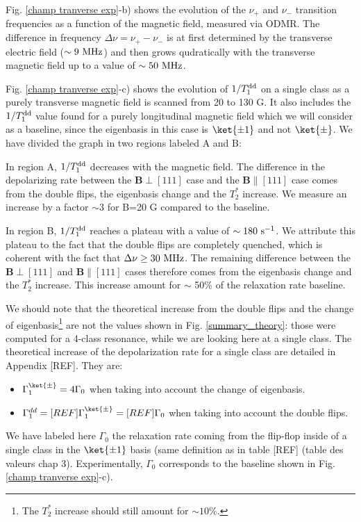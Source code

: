 \documentclass[a4paper,11pt]{report}
\begin{document}
Fig. \ref{champ tranverse exp}-b) shows the evolution of the $\nu_+$ and $\nu_-$ transition frequencies as a function of the magnetic field, measured via ODMR. The difference in frequency $\Delta \nu = \nu_+ - \nu_-$ is at first determined by the transverse electric field ($\sim 9\ \rm MHz$) and then grows qudratically with the transverse magnetic field up to a value of $\sim 50\ \rm MHz$.

Fig. \ref{champ tranverse exp}-c) shows the evolution of $1/T_1^{\rm dd}$ on a single class as a purely transverse magnetic field is scanned from 20 to 130 G. It also includes the $1/T_1^{\rm dd}$ value found for a purely longitudinal magnetic field which we will consider as a baseline, since the eigenbasis in this case is $\ket{\pm 1}$ and not $\ket{\pm}$. We have divided the graph in two regions labeled A and B:

In region A, $1/T_1^{\rm dd}$ decreases with the magnetic field. The difference in the depolarizing rate between the $\mathbf{B} \perp [111]$ case and the $\mathbf{B} \parallel [111]$ case comes from the double flips, the eigenbasis change and the $T_2^*$ increase. We measure an increase by a factor $\sim 3$ for B=20 G compared to the baseline.

In region B, $1/T_1^{\rm dd}$ reaches a plateau with a value of $\sim 180\ \rm s^{-1}$. We attribute this plateau to the fact that the double flips are completely quenched, which is coherent with the fact that $\Delta \nu \geq 30\ \rm MHz$. The remaining difference between the $\mathbf{B} \perp [111]$ and $\mathbf{B} \parallel [111]$ cases therefore comes from the eigenbasis change and the $T_2^*$ increase. This increase amount for $\sim$ 50\% of the relaxation rate baseline.

We should note that the theoretical increase from the double flips and the change of eigenbasis\footnote{The $T_2^*$ increase should still amount for $\sim 10\%$.} are not the values shown in Fig. \ref{summary_theory}: those were computed for a 4-class resonance, while we are looking here at a single class. The theoretical increase of the depolarization rate for a single class are detailed in Appendix [REF]. They are:
\begin{itemize}
\item $\Gamma_1^{\ket{\pm}}=4 \Gamma_0$ when taking into account the change of eigenbasis.
\item $\Gamma_1^{dd}=[REF]\Gamma_1^{\ket{\pm}}=[REF]\Gamma_0$ when taking into account the double flips.
\end{itemize}
We have labeled here $\Gamma_0$ the relaxation rate coming from the flip-flop inside of a single class in the $\ket{\pm 1}$ basis (same definition as in table [REF] (table des valeurs chap 3). Experimentally, $\Gamma_0$ corresponds to the baseline shown in Fig. \ref{champ tranverse exp}-c).
\end{document}

